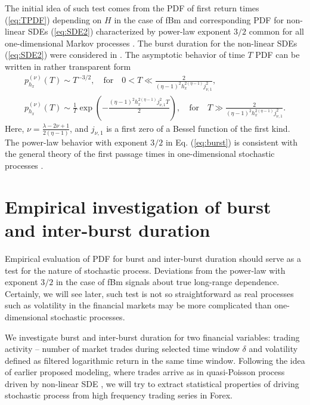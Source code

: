\documentclass{article}
\begin{document}
The initial idea of such test comes from the PDF of first return times (\ref{eq:TPDF}) depending on $H$ in the case of fBm and corresponding PDF for non-linear SDEs (\ref{eq:SDE2}) characterized by power-law exponent $3/2$ common for all one-dimensional Markov processes \cite{Borodin2002Birkhauser,Jeanblanc2009Springer,Gardiner2009Springer,Redner2001Cambridge}. 
The burst duration for the non-linear SDEs (\ref{eq:SDE2}) were considered in \cite{Gontis2012ACS}. The asymptotic behavior of time $T$ PDF can be written in rather transparent form
\begin{gather}
p_{h_x}^{(\nu)}(T) \sim T^{-3/2}, \quad \text{for} \quad 0 < T \ll \frac{2}{(\eta-1)^2 h_x^{2(\eta-1)}j_{\nu,1}^2}, \\
p_{h_x}^{(\nu)}(T) \sim \frac{1}{T}\exp\left(-\frac{(\eta-1)^2 h_x^{2(\eta-1)}j_{\nu,1}^2 T}{2}\right) , \quad \text{for} \quad T \gg \frac{2}{(\eta-1)^2 h_x^{2(\eta-1)}j_{\nu,1}^2}.
\label{eq:burst}
\end{gather}
Here, $\nu=\frac{\lambda-2\nu+1}{2(\eta-1)}$, and $j_{\nu,1}$ is a first zero of a Bessel function of the first kind. The power-law behavior with exponent $3/2$ in Eq. (\ref{eq:burst}) is consistent with the general theory of the first passage times in one-dimensional stochastic processes \cite{Redner2001Cambridge,Jeanblanc2009Springer}. 

\section{Empirical investigation of burst and inter-burst duration}
\label{sec:empirical}

Empirical evaluation of PDF for burst and inter-burst duration should serve as a test for the nature of stochastic process. Deviations from the power-law with exponent $3/2$ in the case of fBm signals about true long-range dependence. Certainly, we will see later, such test is not so straightforward as real processes such as volatility in the financial markets may be more complicated than one-dimensional stochastic processes.

We investigate  burst and inter-burst duration for two financial variables: trading activity -- number of market trades during selected time window $\delta$ and volatility defined as filtered logarithmic return in the same time window. Following the idea of earlier proposed modeling, where trades arrive as in quasi-Poisson process driven by non-linear SDE \cite{Gontis2006JStatMech,Gontis2007PhysA,Gontis2008PhysA}, we will try to extract statistical properties of driving stochastic process from high frequency trading series in Forex. 
\end{document}
